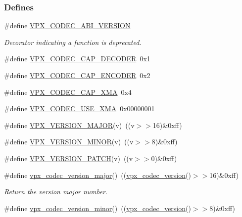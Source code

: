 \subsubsection*{\-Defines}
\begin{DoxyCompactItemize}
\item 
\#define \hyperlink{group__codec_gaf7e9cad2df0f81679b881f46740ad097}{\-V\-P\-X\-\_\-\-C\-O\-D\-E\-C\-\_\-\-A\-B\-I\-\_\-\-V\-E\-R\-S\-I\-O\-N}
\begin{DoxyCompactList}\small\item\em \-Decorator indicating a function is deprecated. \end{DoxyCompactList}\item 
\#define \hyperlink{group__codec_gae10ad7f9548170aef77df09d48ad108a}{\-V\-P\-X\-\_\-\-C\-O\-D\-E\-C\-\_\-\-C\-A\-P\-\_\-\-D\-E\-C\-O\-D\-E\-R}~0x1
\item 
\#define \hyperlink{group__codec_gab2e8b76fff95ebd573a17bdc11f8a441}{\-V\-P\-X\-\_\-\-C\-O\-D\-E\-C\-\_\-\-C\-A\-P\-\_\-\-E\-N\-C\-O\-D\-E\-R}~0x2
\item 
\#define \hyperlink{group__codec_gadbaf864317eb8294fd518862a1e6f9d4}{\-V\-P\-X\-\_\-\-C\-O\-D\-E\-C\-\_\-\-C\-A\-P\-\_\-\-X\-M\-A}~0x4
\item 
\#define \hyperlink{group__codec_gab363c255f13717f693762c3dcf0b93d6}{\-V\-P\-X\-\_\-\-C\-O\-D\-E\-C\-\_\-\-U\-S\-E\-\_\-\-X\-M\-A}~0x00000001
\item 
\#define \hyperlink{group__codec_gadebddd67347fe47c0772b1e06b6173ba}{\-V\-P\-X\-\_\-\-V\-E\-R\-S\-I\-O\-N\-\_\-\-M\-A\-J\-O\-R}(v)~((v$>$$>$16)\&0xff)
\item 
\#define \hyperlink{group__codec_ga4a5ce4588576306dee0d95e8f8706f86}{\-V\-P\-X\-\_\-\-V\-E\-R\-S\-I\-O\-N\-\_\-\-M\-I\-N\-O\-R}(v)~((v$>$$>$8)\&0xff)
\item 
\#define \hyperlink{group__codec_ga4acf2cf4c35ff123d17cd67c069fdbaa}{\-V\-P\-X\-\_\-\-V\-E\-R\-S\-I\-O\-N\-\_\-\-P\-A\-T\-C\-H}(v)~((v$>$$>$0)\&0xff)
\item 
\hypertarget{group__codec_gaf314b746e4e202045e85ac073c29a495}{\#define \hyperlink{group__codec_gaf314b746e4e202045e85ac073c29a495}{vpx\-\_\-codec\-\_\-version\-\_\-major}()~((\hyperlink{group__codec_ga163037ae037ac760da65e4130c7d4767}{vpx\-\_\-codec\-\_\-version}()$>$$>$16)\&0xff)}\label{group__codec_gaf314b746e4e202045e85ac073c29a495}

\begin{DoxyCompactList}\small\item\em \-Return the version major number. \end{DoxyCompactList}\item 
\hypertarget{group__codec_ga2b668688a7d1551ea89bcda8f2587f93}{\#define \hyperlink{group__codec_ga2b668688a7d1551ea89bcda8f2587f93}{vpx\-\_\-codec\-\_\-version\-\_\-minor}()~((\hyperlink{group__codec_ga163037ae037ac760da65e4130c7d4767}{vpx\-\_\-codec\-\_\-version}()$>$$>$8)\&0xff)}\label{group__codec_ga2b668688a7d1551ea89bcda8f2587f93}


\end{DoxyCompactItemize}
